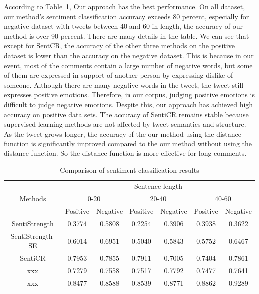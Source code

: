 \documentclass[runningheads]{llncs}
\begin{document}
According to Table~\ref{table:sentiment classification}, Our approach has the best performance. On all dataset, our method's sentiment classification accuracy exceeds 80 percent, especially for negative dataset with tweets between 40 and 60 in length, the accuracy of our method is over 90 percent. There are many details in the table. We can see that except for SentCR, the accuracy of the other three methods on the positive dataset is lower than the accuracy on the negative dataset. This is because in our event, most of the comments contain a large number of negative words, but some of them are expressed in support of another person by expressing dislike of someone. Although there are many negative words in the tweet, the tweet still expresses positive emotions. Therefore, in our corpus, judging positive emotions is difficult to judge negative emotions. Despite this, our approach has achieved high accuracy on positive data sets. The accuracy of SentiCR remains stable because supervised learning methods are not affected by tweet semantics and structure. As the tweet grows longer, the accuracy of the our method using the distance function is significantly improved compared to the our method without using the distance function. So the distance function is more effective for long comments.

\begin{table}[ht]
\caption{Comparison of sentiment classification results}\label{table:sentiment classification}
\begin{center}
\begin{tabular}{|c|c|c|c|c|c|c|}
\hline
\multirow{3}{*}{Methods}             & \multicolumn{6}{c|}{Sentence length}                                                \\ \cline{2-7} 
                                     & \multicolumn{2}{c|}{0-20} & \multicolumn{2}{c|}{20-40} & \multicolumn{2}{c|}{40-60} \\ \cline{2-7} 
                                     & Positive    & Negative    & Positive     & Negative    & Positive     & Negative    \\ \hline
SentiStrength                        & 0.3774      & 0.5808      & 0.2254       & 0.3906      & 0.3938       & 0.3622      \\ \hline
SentiStrength-SE                     & 0.6014      & 0.6951      & 0.5040       & 0.5843      & 0.5752       & 0.6467      \\ \hline
SentiCR                              & 0.7953      & 0.7855      & 0.7911       & 0.7005      & 0.7404       & 0.7861      \\ \hline
xxx & 0.7279      & 0.7558      & 0.7517       & 0.7792      & 0.7477       & 0.7641      \\ \hline
xxx                           & 0.8477      & 0.8588      & 0.8539       & 0.8771      & 0.8862       & 0.9289      \\ \hline
\end{tabular}
\end{center}
\end{table}
\end{document}
